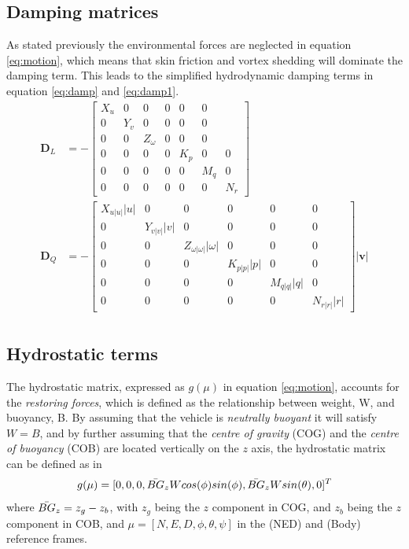 \subsection{Damping matrices}
As stated previously the environmental forces are neglected in equation \ref{eq:motion}, which means that skin friction and vortex shedding will dominate the damping term. This leads to the simplified hydrodynamic damping terms in equation \ref{eq:damp} and \ref{eq:damp1}.
\begin{align}
    \mathbf{D}_{L} & = -\begin{bmatrix}
                X_{u} & 0 & 0 & 0 & 0 & 0\\
                0 & Y_{v} & 0 & 0 & 0 & 0 \\
                0 & 0 & Z_{\omega} & 0 & 0 & 0 \\
                0 & 0 & 0 & 0 & K_{p} & 0 & 0 \\
                0 & 0 & 0 & 0 & 0 & M_{q} & 0 \\
                0 & 0 & 0 & 0 & 0 & 0 & N_{r} 
                \label{eq:damp}
                \end{bmatrix} \\
    \mathbf{D}_{Q} & = -\begin{bmatrix}
                X_{u|u|}|u| & 0 & 0 & 0 & 0 & 0\\
                0 & Y_{v|v|}|v| & 0 & 0 & 0 & 0\\
                0 & 0 & Z_{\omega|\omega|}|\omega| & 0 & 0 & 0\\
                0 & 0 & 0 & K_{p|p|}|p| & 0 & 0 \\
                0 & 0 & 0 & 0 & M_{q|q|}|q| & 0 \\
                0 & 0 & 0 & 0 & 0 & N_{r|r|}|r|
                \label{eq:damp1}
                \end{bmatrix}|\mathbf{v}| \\
\end{align}
\subsection{Hydrostatic terms}
The hydrostatic matrix, expressed as $g(\mu)$ in equation \ref{eq:motion}, accounts for the \textit{restoring forces}, which is defined as the relationship between weight, W, and buoyancy, B. By assuming that the vehicle is \textit{neutrally buoyant} it will satisfy $W = B$, and by further assuming that the \textit{centre of gravity} (COG) and the \textit{centre of buoyancy} (COB) are located vertically on the $z$ axis, the hydrostatic matrix can be defined as in \cite{Fossen}
\begin{equation}
    g(\mu) = [0, 0, 0, \Bar{BG}_{z} W cos(\phi)sin(\phi), \Bar{BG}_{z} W sin(\theta), 0]^{T}
\end{equation}
where $\Bar{BG}_{z}=z_{g}-z_{b}$, with $z_{g}$ being the $z$ component in COG, and $z_{b}$ being the $z$ component in COB, and $\mu = [N, E, D, \phi, \theta, \psi]$ in the (NED) and (Body) reference frames. 
